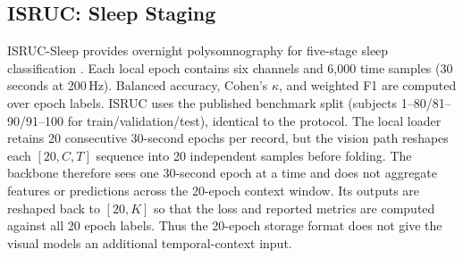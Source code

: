 \subsection{ISRUC: Sleep Staging}
ISRUC-Sleep provides overnight polysomnography for five-stage sleep classification \citep{khalighi2016isruc}. Each local epoch contains six channels and 6,000 time samples (30 seconds at 200\,Hz). Balanced accuracy, Cohen's $\kappa$, and weighted F1 are computed over epoch labels.
ISRUC uses the published benchmark split (subjects 1--80/81--90/91--100 for
train/validation/test), identical to the \reve{} protocol. The local loader
retains 20 consecutive 30-second epochs per record, but the vision path
reshapes each $[20,C,T]$ sequence into 20 independent samples before folding.
The backbone therefore sees one 30-second epoch at a time and does not
aggregate features or predictions across the 20-epoch context window. Its
outputs are reshaped back to $[20,K]$ so that the loss and reported metrics are
computed against all 20 epoch labels. Thus the 20-epoch storage format does not
give the visual models an additional temporal-context input.
